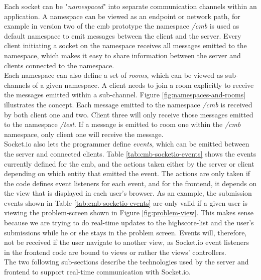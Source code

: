 Each socket can be "\textit{namespaced}" into separate communication channels within an application. A namespace can be viewed as an endpoint or network path, for example in version two of the \gls{cmb} prototype the namespace \textit{/cmb} is used as default namespace to emit messages between the client and the server. Every client initiating a socket on the namespace receives all messages emitted to the namespace, which makes it easy to share information between the server and clients connected to the namespace. \\

Each namespace can also define a set of \textit{rooms}, which can be viewed as sub-channels of a given namespace. A client needs to join a room explicitly to receive the messages emitted within a sub-channel. Figure \ref{fig:namespaces-and-rooms} illustrates the concept. Each message emitted to the namespace \textit{/cmb} is received by both client one and two. Client three will only receive those messages emitted to the namespace \textit{/test}. If a message is emitted to room one within the \textit{/cmb} namespace, only client one will receive the message. \\

Socket.io also lets the programmer define \textit{events}, which can be emitted between the server and connected clients. Table \ref{tab:cmb-socketio-events} shows the events currently defined for the \gls{cmb}, and the actions taken either by the server or client depending on which entity that emitted the event. The actions are only taken if the code defines event listeners for each event, and for the frontend, it depends on the view that is displayed in each user's browser. As an example, the submission events shown in Table \ref{tab:cmb-socketio-events} are only valid if a given user is viewing the problem-screen shown in Figure \ref{fig:problem-view}. This makes sense because we are trying to do real-time updates to the highscore-list and the user’s submissions while he or she stays in the problem screen. Events will, therefore, not be received if the user navigate to another view, as Socket.io event listeners in the frontend code are bound to views or rather the views’ controllers.  \\

The two following sub-sections describe the technologies used by the server and frontend to support real-time communication with Socket.io.

